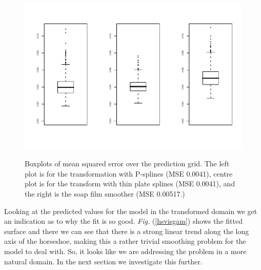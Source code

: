 \documentclass[a4paper,10pt]{amsart}
\newcommand{\Fig}[1]{\emph{Fig.} (\ref{#1})}
\begin{document}
\begin{figure}
\centering
\includegraphics[trim=0.5in 0in 0in 0in]{figs/scvssoapboxplot.pdf} \\
\caption{Boxplots of mean squared error over the prediction grid. The left plot is for the transformation with P-splines (MSE 0.0041), centre plot is for the transform with thin plate splines (MSE 0.0041), and the right is the soap film smoother (MSE 0.00517.)} 
\label{scvssoapboxplot}
\end{figure}

Looking at the predicted values for the model in the transformed domain we get an indication as to why the fit is so good. \Fig{hsvisgam} shows the fitted surface and there we can see that there is a strong linear trend along the long axis of the horseshoe, making this a rather trivial smoothing problem for the model to deal with. So, it looks like we are addressing the problem in a more natural domain. In the next section we investigate this further.
\end{document}
